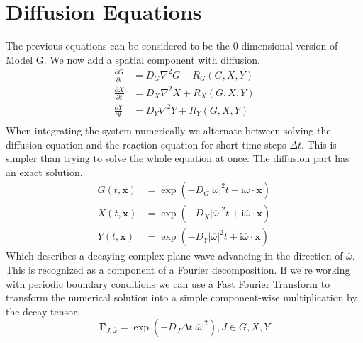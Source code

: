 \documentclass{article}
\begin{document}
\section{Diffusion Equations}
The previous equations can be considered to be the 0-dimensional version of Model G. We now add a spatial component with diffusion.
\begin{align*}
\frac{\partial G}{\partial t} &= D_G \nabla^2 G + R_G(G, X, Y) \\
\frac{\partial X}{\partial t} &= D_X \nabla^2 X + R_X(G, X, Y) \\
\frac{\partial Y}{\partial t} &= D_Y \nabla^2 Y + R_Y(G, X, Y) \\
\end{align*}
When integrating the system numerically we alternate between solving the diffusion equation and the reaction equation for short time steps $\Delta t$. This is simpler than trying to solve the whole equation at once. The diffusion part has an exact solution.
\begin{align}
G(t, \mathbf{x}) &= \exp(-D_G |\overline{\omega}|^2 t + \mathrm i \overline{\omega} \cdot \mathbf{x}) \label{eq:diffusion_exact} \\
X(t, \mathbf{x}) &= \exp(-D_X |\overline{\omega}|^2 t + \mathrm i \overline{\omega} \cdot \mathbf{x}) \\
Y(t, \mathbf{x}) &= \exp(-D_Y |\overline{\omega}|^2 t + \mathrm i \overline{\omega} \cdot \mathbf{x})
\end{align}
Which describes a decaying complex plane wave advancing in the direction of $\overline{\omega}$. This is recognized as a component of a Fourier decomposition. If we're working with periodic boundary conditions we can use a Fast Fourier Transform to transform the numerical solution into a simple component-wise multiplication by the decay tensor.
\begin{equation}
\mathbf \Gamma_{J,\overline{\omega}} = \exp \left (-D_J \Delta t |\overline{\omega}|^2 \right), J \in {G, X, Y}
\end{equation}
\end{document}

